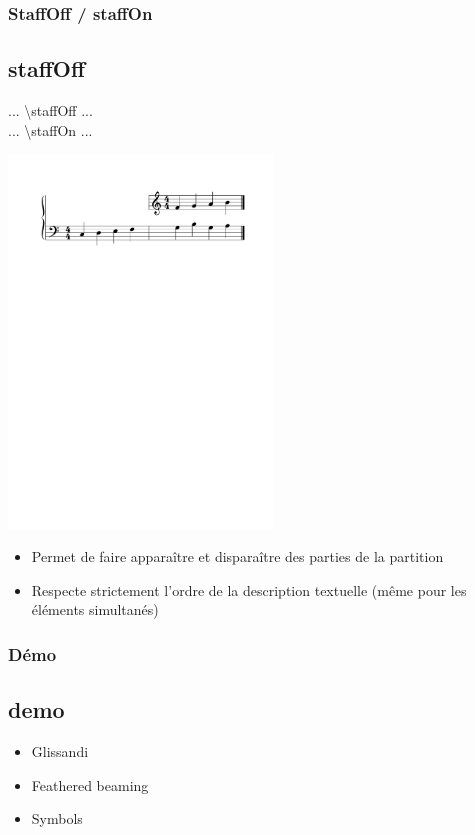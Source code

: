 \documentclass[12pt]{beamer}
\newenvironment{code}
  {\fontfamily{prc}\selectfont}{}
\begin{document}
    \begin{frame}
    \frametitle{StaffOff / staffOn}
    \subsection{staffOff}
    
    \begin{code} ... \textbackslash{}staffOff ... \hspace{1cm} \end{code} \\
    \begin{code} ... \textbackslash{}staffOn ... \end{code}
    
    \begin{center} \includegraphics[width=7cm]{img/staffoff.pdf} \end{center}
    
    \vspace{-0.5cm}
    
    \begin{itemize}
      \item Permet de faire apparaître et disparaître des parties de la partition
      \item Respecte strictement l'ordre de la description textuelle (même pour les éléments simultanés)
    \end{itemize}
    
    \end{frame}
    
    
    \begin{frame}
        \frametitle{Démo}
        \subsection{demo}
        
        \begin{itemize}
        	\item Glissandi
        	\item Feathered beaming
        	\item Symbols
        \end{itemize}
        
    \end{frame}
\end{document}

